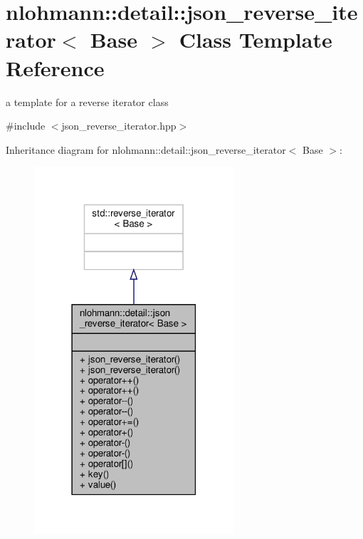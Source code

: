 \hypertarget{classnlohmann_1_1detail_1_1json__reverse__iterator}{}\section{nlohmann\+:\+:detail\+:\+:json\+\_\+reverse\+\_\+iterator$<$ Base $>$ Class Template Reference}
\label{classnlohmann_1_1detail_1_1json__reverse__iterator}


a template for a reverse iterator class  




{\ttfamily \#include $<$json\+\_\+reverse\+\_\+iterator.\+hpp$>$}



Inheritance diagram for nlohmann\+:\+:detail\+:\+:json\+\_\+reverse\+\_\+iterator$<$ Base $>$\+:
\nopagebreak
\begin{figure}[H]
\begin{center}
\leavevmode
\includegraphics[width=210pt]{classnlohmann_1_1detail_1_1json__reverse__iterator__inherit__graph}
\end{center}
\end{figure}


